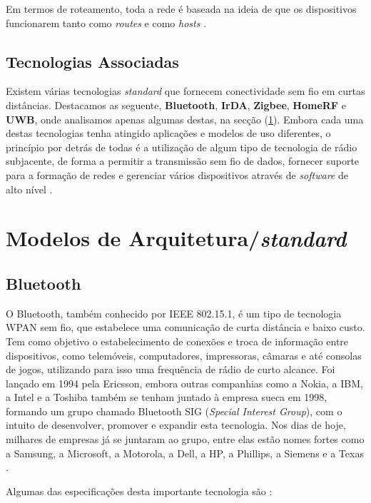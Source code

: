\documentclass[conference]{IEEEtran}
\begin{document}
Em termos de roteamento, toda a rede é baseada na ideia de que os dispositivos funcionarem tanto como \textit{routes} e como \textit{hosts} \cite{prasad2004ofdm}.


\subsection{Tecnologias Associadas}

Existem várias tecnologias \textit{standard} que fornecem conectividade sem fio em curtas distâncias. 
Destacamos as seguente, \textbf{Bluetooth}, \textbf{IrDA}, \textbf{Zigbee}, \textbf{HomeRF} e \textbf{UWB}, onde analisamos apenas algumas destas, na secção (\ref{arquiteturas}).
Embora cada uma destas tecnologias tenha atingido aplicações e modelos de uso diferentes, o princípio por detrás de todas é a utilização de algum tipo de tecnologia de rádio subjacente, de forma a permitir a transmissão sem fio de dados, fornecer suporte para a formação de redes e gerenciar vários dispositivos através de \textit{software} de alto nível \cite{prasad2004ofdm}.


\section{Modelos de Arquitetura/\textit{standard}} \label{arquiteturas}

\subsection{Bluetooth} \label{bluetooth}

O Bluetooth, também conhecido por IEEE 802.15.1, é um tipo de tecnologia WPAN sem fio, que estabelece uma comunicação de curta distância e baixo custo. 
Tem como objetivo o estabelecimento de conexões e troca de informação entre dispositivos, como telemóveis, computadores, impressoras, câmaras e até consolas de jogos, utilizando para isso uma frequência de rádio de curto alcance. 
Foi lançado em 1994 pela Ericsson, embora outras companhias como a Nokia, a IBM, a Intel e a Toshiba também se tenham juntado à empresa sueca em 1998, formando um grupo chamado Bluetooth SIG (\textit{Special Interest Group}), com o intuito de desenvolver, promover e expandir esta tecnologia. 
Nos dias de hoje, milhares de empresas já se juntaram ao grupo, entre elas estão nomes fortes como a Samsung, a Microsoft, a Motorola, a Dell, a HP, a Phillips, a Siemens e a Texas \cite{bluetoothwiki}.

Algumas das especificações desta importante tecnologia são \cite{kobayashi2004tecnologia}:
\end{document}
